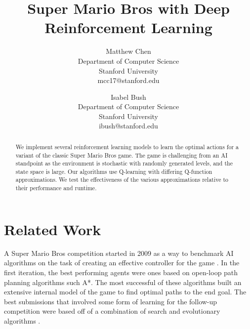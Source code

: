 \documentclass[12pt]{article}
\begin{document}
\nocite{*}

\title{Super Mario Bros with Deep Reinforcement Learning}

\author{
  Matthew Chen\\
  \small \vspace{-2mm} Department of Computer Science\\
  \small \vspace{-2mm} Stanford University\\
  \small mcc17@stanford.edu
  \and
  Isabel Bush\\
  \small \vspace{-2mm} Department of Computer Science\\
  \small \vspace{-2mm} Stanford University\\
  \small ibush@stanford.edu
}
\date{}
\maketitle

\begin{abstract}
We implement several reinforcement learning models to learn the optimal actions for a variant of the classic Super Mario Bros game. The game is challenging from an AI standpoint as the environment is stochastic with randomly generated levels, and the state space is large. Our algorithms use Q-learning with differing Q-function approximations. We test the effectiveness of the various approximations relative to their performance and runtime.

\end{abstract}

\section{Related Work}

A Super Mario Bros competition started in 2009 as a way to benchmark AI algorithms on the task of creating an effective controller for the game \cite{togelius20102009}. In the first iteration, the best performing agents were ones based on open-loop path planning algorithms such A*. The most successful of these algorithms built an extensive internal model of the game to find optimal paths to the end goal. The best submissions that involved some form of learning for the follow-up competition were based off of a combination of search and evolutionary algorithms \cite{karakovskiy2012mario}.
\end{document}
